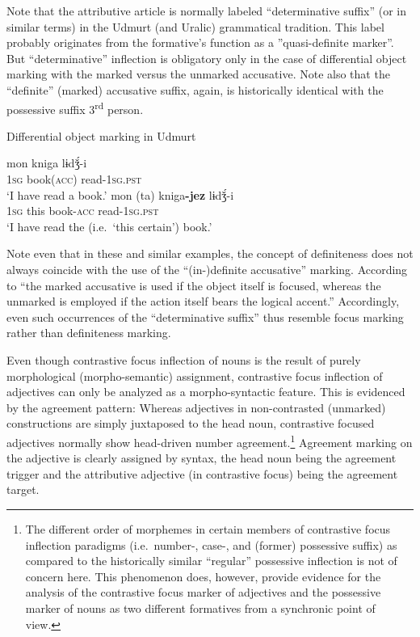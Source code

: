 Note that the attributive article is normally labeled “determinative suffix” (or in similar terms) in the Udmurt (and Uralic) grammatical tradition. This label probably originates from the formative's function as a ”quasi-definite marker”. But “determinative” inflection is obligatory only in the case of differential object marking with the marked versus the unmarked accusative. Note also that the “definite” (marked) accusative suffix, again, is historically identical with the possessive suffix 3\textsuperscript{rd} person.%
\begin{exe}
\ex \rm{Differential object marking in Udmurt \citep[22]{winkler2001}}
\begin{xlist}
\ex
\gll	mon kniga lɨdǯ́-i\\
	\textsc{1sg} book(\textsc{acc}) read-\textsc{1sg.pst}\\
\glt	‘I have read a book.’
\ex	
\gll	mon (ta) kniga\textbf{-jez} lɨdǯ́-i\\
	\textsc{1sg} this book-\textsc{acc} read-\textsc{1sg.pst}\\
\glt	‘I have read the (i.e.~‘this certain’) book.’
\end{xlist}
\end{exe}
Note even that in these and similar examples, the concept of definiteness does not always coincide with the use of the “(in-)definite accusative” marking. According to \citet[21]{winkler2001} “the marked accusative is used if the object itself is focused, whereas the unmarked is employed if the action itself bears the logical accent.” Accordingly, even such occurrences of the “determinative suffix” thus resemble focus marking rather than definiteness marking.

Even though contrastive focus inflection of nouns is the result of purely morphological (morpho-semantic) assignment, contrastive focus inflection of adjectives can only be analyzed as a morpho-syntactic feature. This is evidenced by the agreement pattern: Whereas adjectives in non-contrasted (unmarked) constructions are simply juxtaposed to the head noun, contrastive focused adjectives normally show head\hyp{}driven number agreement.\footnote{The different order of morphemes in certain members of contrastive focus inflection paradigms (i.e.~number-, case-, and (former) possessive suffix) as compared to the historically similar “regular” possessive inflection \citep[32]{winkler2001} is not of concern here. This phenomenon does, however, provide evidence for the analysis of the contrastive focus marker of adjectives and the possessive marker of nouns as two different formatives from a synchronic point of view.} Agreement marking on the adjective is clearly assigned by syntax, the head noun being the agreement trigger and the attributive adjective (in contrastive focus) being the agreement target.

